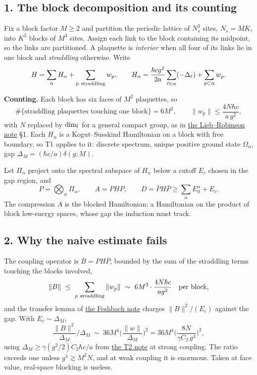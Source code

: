 \documentclass[11pt,a4paper]{article}
\begin{document}
\hypertarget{the-block-decomposition-and-its-counting}{%
\subsection{1. The block decomposition and its
counting}\label{the-block-decomposition-and-its-counting}}

Fix a block factor \(M\ge2\) and partition the periodic lattice of
\(N_s^3\) sites, \(N_s=MK\), into \(K^3\) blocks of \(M^3\) sites.
Assign each link to the block containing its midpoint, so the links are
partitioned. A plaquette is \emph{interior} when all four of its links
lie in one block and \emph{straddling} otherwise. Write
\[H=\sum_{\alpha}H_\alpha+\sum_{p\ \rm straddling}w_p,\qquad
H_\alpha=\frac{\hbar cg^2}{2a}\sum_{\ell\in\alpha}(-\Delta_\ell)
+\sum_{p\subset\alpha}w_p .\]

\textbf{Counting.} Each block has six faces of \(M^2\) plaquettes, so
\[\#\{\text{straddling plaquettes touching one block}\}=6M^2,
\qquad \|w_p\|\le\frac{4N\hbar c}{a\,g^2},\] with \(N\) replaced by
\(\dim_{\rm f}\) for a general compact group, as in
\href{lieb-robinson-kogut-susskind.md}{the Lieb--Robinson note} §1. Each
\(H_\alpha\) is a Kogut--Susskind Hamiltonian on a block with free
boundary, so T1 applies to it: discrete spectrum, unique positive ground
state \(\Omega_\alpha\), gap \(\Delta_M=(\hbar c/a)\delta(g;M)\).

Let \(\Pi_\alpha\) project onto the spectral subspace of \(H_\alpha\)
below a cutoff \(E_c\) chosen in the gap region, and
\[P=\bigotimes_\alpha\Pi_\alpha,\qquad A=PHP,\qquad D=\bar PH\bar P\ge\textstyle\sum_\alpha E_0^\alpha+E_c .\]
The compression \(A\) is the blocked Hamiltonian: a Hamiltonian on the
product of block low-energy spaces, whose gap the induction must track.

\hypertarget{why-the-naive-estimate-fails}{%
\subsection{2. Why the naive estimate
fails}\label{why-the-naive-estimate-fails}}

The coupling operator is \(B=PH\bar P\), bounded by the sum of the
straddling terms touching the blocks involved,
\[\|B\|\ \le\ \sum_{p\ \rm straddling}\|w_p\|\ \sim\ 6M^2\cdot\frac{4N\hbar c}{a g^2}
\quad\text{per block},\] and the transfer lemma of
\href{weak-coupling-feshbach-reduction.md}{the Feshbach note} charges
\(\|B\|^2/(E_c)\) against the gap. With \(E_c\sim\Delta_M\),
\[\frac{\|B\|^2}{\Delta_M}\Big/\Delta_M
\ \sim\ 36M^4\Big(\frac{\|w\|}{\Delta_M}\Big)^2
=36M^4\Big(\frac{8N}{\gamma C_2\,g^4}\Big)^2,\] using
\(\Delta_M\ge\gamma(g^2/2)C_2\hbar c/a\) from
\href{strong-coupling-uniform-gap.md}{the T2 note} at strong coupling.
The ratio exceeds one unless \(g^4\gtrsim M^2N\), and at weak coupling
it is enormous. Taken at face value, real-space blocking is useless.
\end{document}
